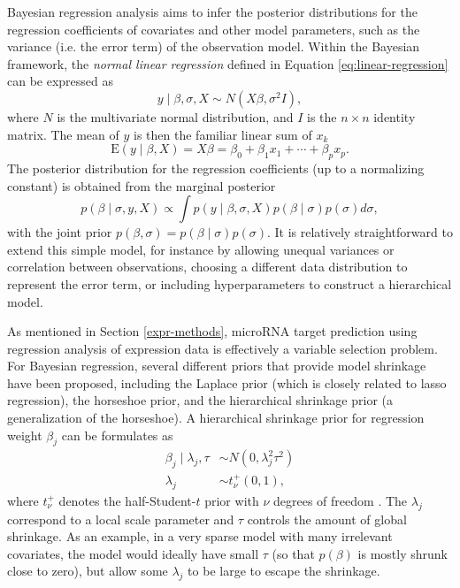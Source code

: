 Bayesian regression analysis aims to infer the posterior distributions
for the regression coefficients of covariates and other model parameters,
such as the variance (i.e. the error term) of the observation model.
Within the Bayesian framework, the \emph{normal linear regression} defined in
Equation \eqref{eq:linear-regression} can be expressed as
\begin{equation}
  y \mid \beta, \sigma, X \sim N(X \beta, \sigma^2I),
  \label{eq:bayesian-linear-regression}
\end{equation}
where $N$ is the multivariate normal distribution, and $I$ is the $n \times n$
identity matrix. The mean of $y$ is then the familiar linear sum of $x_k$
\begin{equation}
  \textrm{E}(y\mid\beta,X) = X \beta = \beta_0 + \beta_1 x_1 + \dotsb + \beta_p x_p.
\end{equation}
The posterior distribution for the regression coefficients (up to a
normalizing constant) is obtained from the marginal posterior
\begin{equation}
  p(\beta \mid \sigma, y, X) \propto \int p(y \mid \beta, \sigma, X) p(\beta \mid \sigma) p(\sigma) d\sigma,
\end{equation}
with the joint prior $p(\beta, \sigma) = p(\beta \mid \sigma) p(\sigma)$.
It is relatively straightforward to extend this simple model, for instance by
allowing unequal variances or correlation between observations, choosing a
different data distribution
to represent the error term, or including hyperparameters to construct a
hierarchical model.

As mentioned in Section \ref{expr-methods}, microRNA target prediction using
regression analysis of expression data is effectively a variable selection
problem. For Bayesian regression, several different priors that provide model shrinkage
have been proposed, including the Laplace prior (which is closely related to
lasso regression), the horseshoe prior, and the hierarchical shrinkage prior
(a generalization of the horseshoe).
A hierarchical shrinkage prior for regression weight
$\beta_j$ can be formulates as
\begin{equation}
  \label{eq:hs-prior}
  \begin{aligned}
    \beta_j \mid \lambda_j, \tau & \sim N(0, \lambda_j^2 \tau^2) \\
    \lambda_j                 & \sim t_\nu^+(0,1),
  \end{aligned}
\end{equation}
where $t_\nu^+$ denotes the half-Student-$t$ prior with $\nu$ degrees of
freedom \citep{Piironen2015}. The $\lambda_j$ correspond to a local scale
parameter and $\tau$ controls the amount of global shrinkage. As an example,
in a very sparse model with many irrelevant covariates, the model would
ideally have small $\tau$ (so that $p(\beta)$ is mostly shrunk close to zero), but
allow some $\lambda_j$ to be large to escape the shrinkage.

